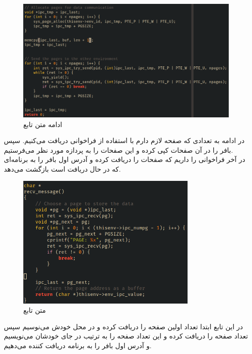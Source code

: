\documentclass[a4paper, 12pt]{article}
\begin{document}
\begin{figure}[H]
    \centering
    \includegraphics[width=1.0\textwidth]{send2.png}
    \caption{
        ادامه
        متن تابع
    }
    \label{fig4output}
\end{figure}
در ادامه به تعدادی که صفحه‌ لازم دارم با استفاده از فراخوانی
دریافت می‌کنیم.
سپس بافر را در آن صفحات کپی کرده و این صفحات را به پردازه مورد نظر می‌فرستیم. \\
در آخر فراخوانی
را داریم که صفحات را دریافت کرده و آدرس اول بافر را به برنامه‌ای که در حال دریافت است بازگشت
می‌دهد.
\begin{figure}[H]
    \centering
    \includegraphics[width=0.8\textwidth]{recv.png}
    \caption{
        متن تابع
    }
    \label{fig5output}
\end{figure}
در این تابع ابتدا تعداد اولین صفحه را دریافت کرده و در محل خودش می‌نوسیم
سپس تعداد صفحه را دریافت کرده و این تعداد صفحه را به ترتیب در جای خودشان می‌نویسیم
و آدرس اول بافر را به برنامه دریافت کننده می‌دهیم. \\
\end{document}
